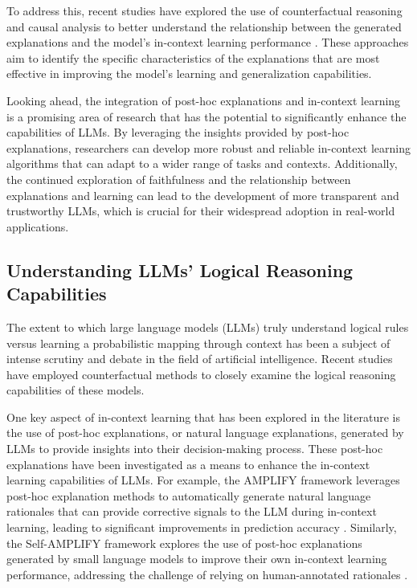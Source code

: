 \documentclass[11pt]{article}
\begin{document}
To address this, recent studies have explored the use of counterfactual reasoning and causal analysis to better understand the relationship between the generated explanations and the model's in-context learning performance \cite{ref196}. These approaches aim to identify the specific characteristics of the explanations that are most effective in improving the model's learning and generalization capabilities.

Looking ahead, the integration of post-hoc explanations and in-context learning is a promising area of research that has the potential to significantly enhance the capabilities of LLMs. By leveraging the insights provided by post-hoc explanations, researchers can develop more robust and reliable in-context learning algorithms that can adapt to a wider range of tasks and contexts. Additionally, the continued exploration of faithfulness and the relationship between explanations and learning can lead to the development of more transparent and trustworthy LLMs, which is crucial for their widespread adoption in real-world applications.

\subsection{Understanding LLMs' Logical Reasoning Capabilities}

The extent to which large language models (LLMs) truly understand logical rules versus learning a probabilistic mapping through context has been a subject of intense scrutiny and debate in the field of artificial intelligence. Recent studies have employed counterfactual methods to closely examine the logical reasoning capabilities of these models.

One key aspect of in-context learning that has been explored in the literature is the use of post-hoc explanations, or natural language explanations, generated by LLMs to provide insights into their decision-making process. These post-hoc explanations have been investigated as a means to enhance the in-context learning capabilities of LLMs. For example, the AMPLIFY framework leverages post-hoc explanation methods to automatically generate natural language rationales that can provide corrective signals to the LLM during in-context learning, leading to significant improvements in prediction accuracy \cite{ref195}. Similarly, the Self-AMPLIFY framework explores the use of post-hoc explanations generated by small language models to improve their own in-context learning performance, addressing the challenge of relying on human-annotated rationales \cite{ref204}.
\end{document}
